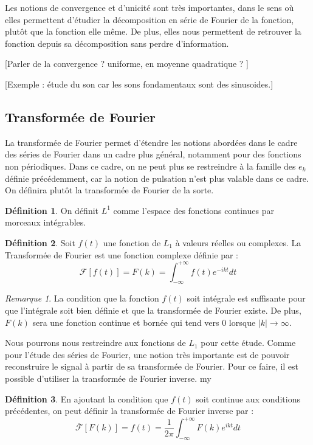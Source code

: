 \documentclass[]{article}
\theoremstyle{remark}
\newtheorem{myrem}{Remarque}
\theoremstyle{definition}
\newtheorem{mydef}{Définition}
\begin{document}
			Les notions de convergence et d'unicité sont très importantes, dans le sens où elles permettent d'étudier la décomposition en série de Fourier de la fonction, plutôt que la fonction elle même. De plus, elles nous permettent de retrouver la fonction depuis sa décomposition sans perdre d'information. 

			[Parler de la convergence ? uniforme, en moyenne quadratique ? ]
			
			
			[Exemple : étude du son car les sons fondamentaux sont des sinusoides.] 
			
			
			
			\subsection{Transformée de Fourier}
				La transformée de Fourier permet d'étendre les notions abordées dans le cadre des séries de Fourier dans un cadre plus général, notamment pour des fonctions non périodiques. 
				Dans ce cadre, on ne peut plus se restreindre à la famille des $e_k$ définie précédemment, car la notion de pulsation n'est plus valable dans ce cadre. On définira plutôt la transformée de Fourier de la sorte. 

			 
			\begin{mydef}
				On définit $L^1$ comme l'espace des fonctions continues par morceaux intégrables. 
			\end{mydef}
			
			\begin{mydef}
				Soit $f(t)$ une fonction de $L_1$ à valeurs réelles ou complexes. La Transformée de Fourier est une fonction complexe définie par :
				$$ \mathcal{F}[f(t)] = F(k)= \int_{-\infty}^{+\infty}f(t)e^{-ikt}dt $$ 
			\end{mydef}
		
			\begin{myrem}
				La condition que la fonction $f(t)$ soit intégrale est suffisante pour que l'intégrale soit bien définie et que la transformée de Fourier existe. 
				De plus, $F(k)$ sera une fonction continue et bornée qui tend vers 0 lorsque $|k| \longrightarrow \infty$.
			\end{myrem}
			
			Nous pourrons nous restreindre aux fonctions de $L_1$ pour cette étude. 
			Comme pour l'étude des séries de Fourier, une notion très importante est de pouvoir reconstruire le signal à partir de sa transformée de Fourier. Pour ce faire, il est possible d'utiliser la transformée de Fourier inverse. 
			my
			\begin{mydef}
				En ajoutant la condition que $f(t)$ soit continue aux conditions précédentes, on peut définir la transformée de Fourier inverse par :
				$$ \overline{\mathcal{F}}[F(k)] = f(t)=\frac{1}{2\pi} \int_{-\infty}^{+\infty}F(k)e^{ikt}dt $$ 
				
			\end{mydef}
			
\end{document}
